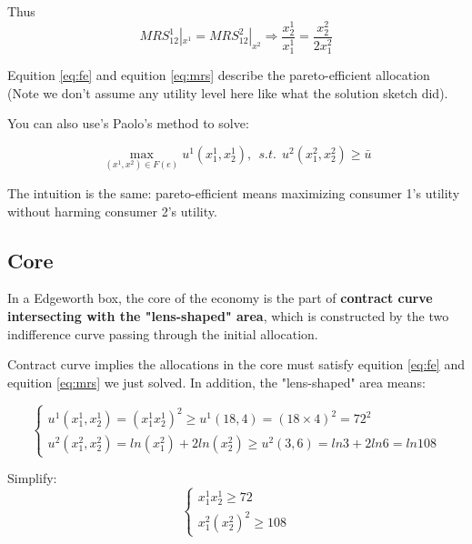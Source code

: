 \documentclass{article}
\begin{document}
Thus 
\begin{equation}
MRS^1_{12} |_{x^1} = MRS^2_{12}|_{x^2} \Rightarrow
\frac{x^1_2}{x^1_1} = \frac{x^2_2}{2x^2_1}
\label{eq:mrs}
\end{equation}

Equition \ref{eq:fe} and equition \ref{eq:mrs} describe the pareto-efficient allocation (Note we don't assume any utility level here like what the solution sketch did).

\begin{mdframed}[backgroundcolor=blue!20,linecolor=white]
You can also use's Paolo's method to solve:

$$\max_{(x^1,x^2) \in F(e)} u^1(x^1_1,x^1_2), \ \ s.t. \ \ u^2(x^2_1,x^2_2) \ge \bar{u}$$

The intuition is the same: pareto-efficient means maximizing consumer 1's utility without harming consumer 2's utility.

\end{mdframed}

\subsection{Core}
In a Edgeworth box, the core of the economy is the
part of \textbf{contract curve intersecting with the "lens-shaped" area}, which is constructed by the two indifference curve passing through the initial allocation.

\vspace{2mm}

Contract curve implies the allocations in the core must satisfy
equition \ref{eq:fe} and equition \ref{eq:mrs} we just solved.
In addition, the "lens-shaped" area means:

\begin{equation}
    \begin{cases}
u^1(x^1_1,x^1_2) = (x^1_1 x^1_2)^2 \ge u^1(18,4) = (18 \times 4)^2=72^2 \\
u^2(x^2_1,x^2_2) = ln(x^2_1) + 2ln(x^2_2) \ge u^2(3,6)=ln3 +2ln6 =ln108
    \end{cases}
    \nonumber
\end{equation}

Simplify:
\begin{equation}
    \begin{cases}
x^1_1 x^1_2 \ge 72 \\
x^2_1 (x^2_2)^2 \ge 108
    \end{cases}
\label{eq:lens}
\end{equation}
\end{document}
